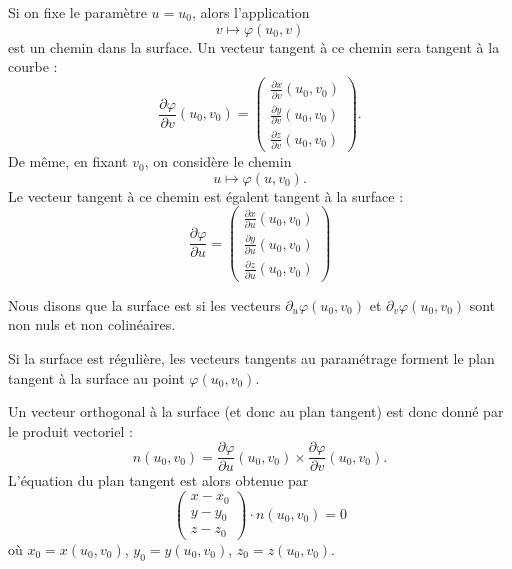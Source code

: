 Si on fixe le paramètre \( u=u_0\), alors l'application
\begin{equation}
	v\mapsto\varphi(u_0,v)
\end{equation}
est un chemin dans la surface. Un vecteur tangent à ce chemin sera tangent à la courbe :
\begin{equation}
	\frac{ \partial \varphi }{ \partial v }(u_0,v_0)=
	\begin{pmatrix}
		\frac{ \partial x }{ \partial v }(u_0,v_0) \\
		\frac{ \partial y }{ \partial v }(u_0,v_0) \\
		\frac{ \partial z }{ \partial v }(u_0,v_0)
	\end{pmatrix}.
\end{equation}
De même, en fixant \( v_0\), on considère le chemin
\begin{equation}
	u\mapsto\varphi(u,v_0).
\end{equation}
Le vecteur tangent à ce chemin est égalent tangent à la surface :
\begin{equation}
	\frac{ \partial \varphi }{ \partial u }=
	\begin{pmatrix}
		\frac{ \partial x }{ \partial u }(u_0,v_0) \\
		\frac{ \partial y }{ \partial u }(u_0,v_0) \\
		\frac{ \partial z }{ \partial u }(u_0,v_0)
	\end{pmatrix}
\end{equation}

\begin{definition}      \label{DefSurfReguliere}
	Nous disons que la surface est  si les vecteurs \( \partial_u\varphi(u_0,v_0)\) et \( \partial_v\varphi(u_0,v_0)\) sont non nuls et non colinéaires.
\end{definition}
Si la surface est régulière, les vecteurs tangents au paramétrage forment le plan tangent à la surface au point \( \varphi(u_0,v_0)\).

Un vecteur orthogonal à la surface (et donc au plan tangent) est donc donné par le produit vectoriel :
\begin{equation}
	n(u_0,v_0)=\frac{ \partial \varphi }{ \partial u }(u_0,v_0)  \times \frac{ \partial \varphi }{ \partial v }(u_0,v_0).
\end{equation}
L'équation du plan tangent est alors obtenue par
\begin{equation}        \label{EqPlanTgSurfaceParm}
	\begin{pmatrix}
		x-x_0 \\
		y-y_0 \\
		z-z_0
	\end{pmatrix}\cdot n(u_0,v_0)=0
\end{equation}
où \( x_0=x(u_0,v_0)\), \( y_0=y(u_0,v_0)\), \( z_0=z(u_0,v_0)\).

